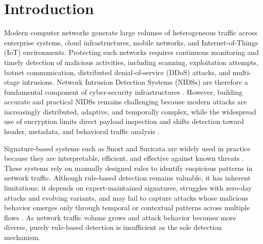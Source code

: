 \documentclass[11pt,fleqn]{report}
\begin{document}
 
\makecoverpage
\tableofcontents
\begin{abstract}      
  State the problem.
  Explain why the problem is a problem.
  Say something surprising.
  Describe consequences of your work

  
  \begin{keywords}    
   Machine leanring, Transformer, Time-aware, LSTM, GRU, CNN-LSTM, Representation
  \end{keywords}
\end{abstract}


\chapter{Introduction}

Modern computer networks generate large volumes of heterogeneous traffic across enterprise systems, cloud infrastructures, mobile networks, and Internet-of-Things (IoT) environments. Protecting such networks requires continuous monitoring and timely detection of malicious activities, including scanning, exploitation attempts, botnet communication, distributed denial-of-service (DDoS) attacks, and multi-stage intrusions. Network Intrusion Detection Systems (NIDSs) are therefore a fundamental component of cyber-security infrastructures \cite{Roesch1999,SommerPaxson2010}. However, building accurate and practical NIDSs remains challenging because modern attacks are increasingly distributed, adaptive, and temporally complex, while the widespread use of encryption limits direct payload inspection and shifts detection toward header, metadata, and behavioral traffic analysis \cite{Sharma2025EncryptedSurvey,Dong2025EncryptedPretrain}.

Signature-based systems such as Snort and Suricata are widely used in practice because they are interpretable, efficient, and effective against known threats \cite{Roesch1999,SuricataGuide2026}. These systems rely on manually designed rules to identify suspicious patterns in network traffic. Although rule-based detection remains valuable, it has inherent limitations: it depends on expert-maintained signatures, struggles with zero-day attacks and evolving variants, and may fail to capture attacks whose malicious behavior emerges only through temporal or contextual patterns across multiple flows \cite{SommerPaxson2010,Hozouri2025Survey}. As network traffic volume grows and attack behavior becomes more diverse, purely rule-based detection is insufficient as the sole detection mechanism.
\end{document}

